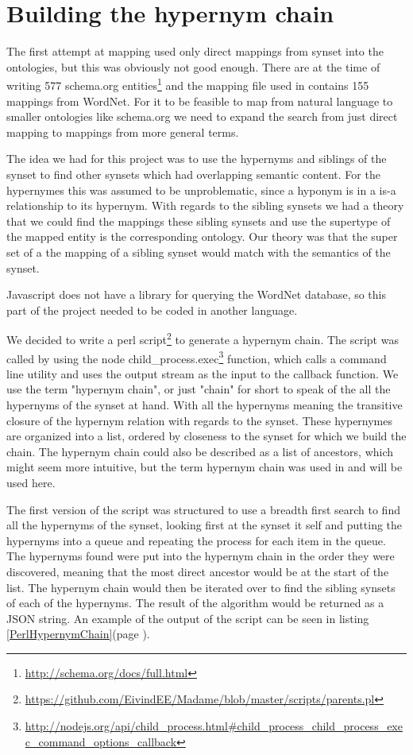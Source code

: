 \section{Building the hypernym chain}
The first attempt at mapping used only direct mappings from synset into the ontologies,
but this was obviously not good enough.
There are at the time of writing 577 schema.org entities\footnote{\url{http://schema.org/docs/full.html}}
and the mapping file used in \theartefact contains 155 mappings from WordNet.
For it to be feasible to map from natural language to smaller ontologies like schema.org we need to expand the search
from just direct mapping to mappings from more general terms.

The idea we had for this project was to use the hypernyms and siblings of the synset to find other synsets
which had overlapping semantic content.
For the hypernymes this was assumed to be unproblematic, since a hyponym is in a is-a relationship to its hypernym.
With regards to the sibling synsets we had a theory that we could find the mappings these sibling synsets
and use the supertype of the mapped entity is the corresponding ontology.
Our theory was that the super set of a the mapping of a sibling synset would match with the semantics of the synset.

Javascript does not have a library for 	querying the WordNet database,
so this part of the project needed to be coded in another language.

We decided to write a perl script\footnote{\url{https://github.com/EivindEE/Madame/blob/master/scripts/parents.pl}} to generate a hypernym chain.
The script was called by using the node
child\_process.exec\footnote{\url{http://nodejs.org/api/child\_process.html\#child\_process\_child\_process\_exec\_command\_options\_callback}}
function, which calls a command line utility and uses the output stream as the input to the callback function.
We use the term "hypernym chain", or just "chain" for short to speak of the all the hypernyms of the synset at hand.
With all the hypernyms meaning  the transitive closure of the hypernym relation with regards to the synset.
These hypernymes are organized into a list, ordered by closeness to the synset for which we build the chain.
The hypernym chain could also be described as a list of ancestors,
which might seem more intuitive, but the term hypernym chain was used in \citet{Veres2011} and will be used here.

The first version of the script was structured to use a breadth first search to find all the hypernyms of the synset,
looking first at the synset it self and putting the hypernyms into a queue and repeating the process for each item in the queue.
The hypernyms found were put into the hypernym chain in the order they were discovered,
meaning that the most direct ancestor would be at the start of the list.
The hypernym chain would then be iterated over to find the sibling synsets of each of the hypernyms.
The result of the algorithm would be returned as a JSON string.
An example of the output of the script can be seen in listing \ref{PerlHypernymChain}(page \pageref{PerlHypernymChain}).

